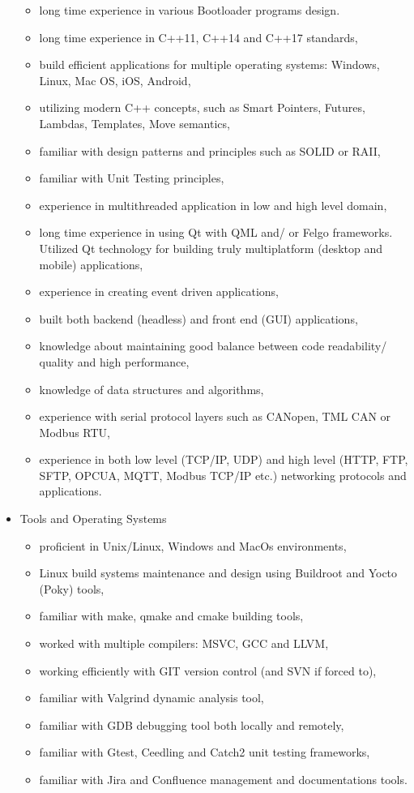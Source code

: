 \documentclass{tccv}
\begin{document}
\begin{itemize}
\begin{itemize}
			\item long time experience in various Bootloader programs design.
			\item long time experience in C++11, C++14 and C++17 standards,
			\item build efficient applications for multiple operating systems: Windows, Linux, Mac OS, iOS, Android,
			\item utilizing modern C++ concepts, such as Smart Pointers, Futures, Lambdas, Templates, Move semantics,
			\item familiar with design patterns and principles such as SOLID or RAII,
			\item familiar with Unit Testing principles,
			\item experience in multithreaded application in low and high level domain,
			\item long time experience in using Qt with QML and/ or Felgo frameworks. Utilized Qt technology for building truly multiplatform (desktop and mobile) applications,
			\item experience in creating event driven applications,
			\item built both backend (headless) and front end (GUI) applications,
			\item knowledge about maintaining good balance between code readability/ quality and high performance,
			\item knowledge of data structures and algorithms,
			\item experience with serial protocol layers such as CANopen, TML CAN or Modbus RTU,
			\item experience in both low level (TCP/IP, UDP) and high level (HTTP, FTP, SFTP, OPCUA, MQTT, Modbus TCP/IP etc.) networking protocols and applications.
		\end{itemize}
	\item Tools and Operating Systems
		\begin{itemize}
			\item proficient in Unix/Linux, Windows and MacOs environments,
			\item Linux build systems maintenance and design using Buildroot and Yocto (Poky) tools,
			\item familiar with make, qmake and cmake building tools,
			\item worked with multiple compilers: MSVC, GCC and LLVM,
			\item working efficiently with GIT version control (and SVN if forced to),
			\item familiar with Valgrind dynamic analysis tool,
			\item familiar with GDB debugging tool both locally and remotely,		
			\item familiar with Gtest, Ceedling and Catch2 unit testing frameworks, 	
			\item familiar with Jira and Confluence management and documentations tools.		
			
		\end{itemize}
\end{itemize}
\end{document}
